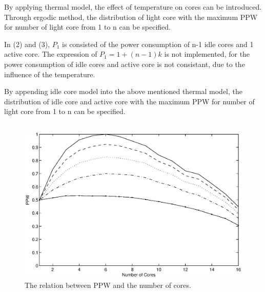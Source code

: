 By applying thermal model, the effect of temperature on cores can be introduced. 
Through ergodic method, the distribution of light core with the maximum PPW
for number of light core from 1 to n can be specified.

In (2) and (3), $P_{1}$ is consisted of the power consumption of n-1 idle cores and 1 active 
core. The expression of $P_{1} = 1+(n-1)k$ is not implemented, for the power consumption of 
idle cores and active core is not consistant, due to the influence of the temperature.

By appending idle core model into the above mentioned thermal model, the distribution of idle
core and active core with the maximum PPW for number of light core from 1 to n can be specified.

\subsection{}

\begin{figure}
\centering
\includegraphics[width=1\columnwidth]{fig/ppw_alpha_ratio.eps}
\caption{The relation between PPW and the number of cores.
}
\label{fig:ppw_alpha_ratio}
\end{figure}